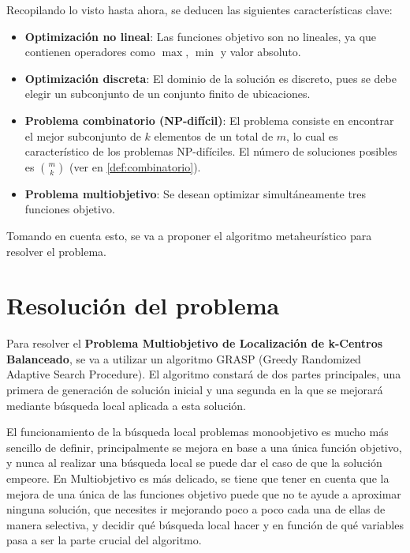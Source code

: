 \documentclass[12pt,a4paper]{book}
\begin{document}
Recopilando lo visto hasta ahora, se deducen las siguientes características clave:

\begin{itemize}
    \item \textbf{Optimización no lineal}: Las funciones objetivo son no lineales, ya que contienen operadores como $\max$, $\min$ y valor absoluto.
    
    \item \textbf{Optimización discreta}: El dominio de la solución es discreto, pues se debe elegir un subconjunto de un conjunto finito de ubicaciones.
    
    \item \textbf{Problema combinatorio (NP-difícil)}: El problema consiste en encontrar el mejor subconjunto de $k$ elementos de un total de $m$, lo cual es característico de los problemas NP-difíciles. El número de soluciones posibles es $\binom{m}{k}$ (ver en \ref{def:combinatorio}).
    
    \item \textbf{Problema multiobjetivo}: Se desean optimizar simultáneamente tres funciones objetivo.
\end{itemize}

Tomando en cuenta esto, se va a proponer el algoritmo metaheurístico para resolver el problema.


\chapter{Resolución del problema}
Para resolver el \textbf{Problema Multiobjetivo de Localización de k-Centros Balanceado}, se va a utilizar un algoritmo GRASP (Greedy Randomized Adaptive Search Procedure).
El algoritmo constará de dos partes principales, una primera de generación de solución inicial y una segunda en la que se mejorará mediante búsqueda local aplicada a esta solución.

El funcionamiento de la búsqueda local problemas monoobjetivo es mucho más sencillo de definir, principalmente se mejora en base a una única función objetivo, y nunca al realizar una búsqueda local se puede dar el caso de que la solución empeore. En Multiobjetivo es más delicado,
se tiene que tener en cuenta que la mejora de una única de las funciones objetivo puede que no te ayude a aproximar ninguna solución, que necesites ir mejorando poco a poco cada una de ellas de manera selectiva, y decidir qué búsqueda local hacer y en función de qué variables pasa
a ser la parte crucial del algoritmo.
\end{document}
